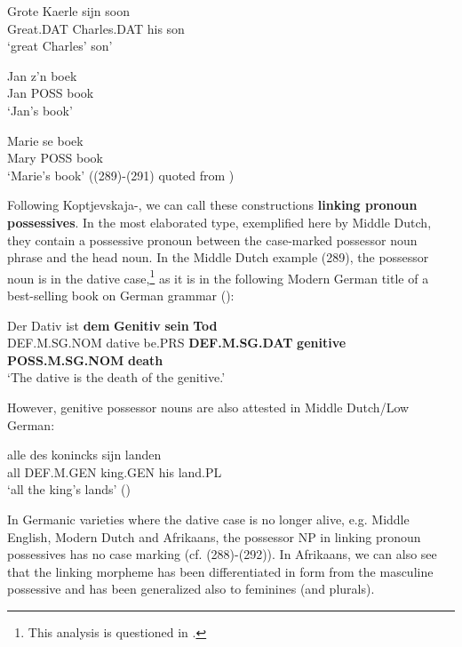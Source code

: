 \ea\label{}
\gll Grote  Kaerle  sijn  soon\\
Great.DAT  Charles.DAT  his  son\\
\glt ‘great Charles’ son’
\z

\ea\label{}
\gll Jan  z’n  boek\\
Jan  POSS   book\\
\glt ‘Jan’s book’
\z

\ea\label{}
\gll Marie  se  boek\\
Mary  POSS  book\\
\glt ‘Marie’s book’ ((289){}-(291) quoted from \citet[56]{Norde1997})
\z

Following Koptjevskaja-\citet{Tamm2003}, we can call these constructions \textbf{linking pronoun possessives}. In the most elaborated type, exemplified here by Middle Dutch, they contain a possessive pronoun between the case-marked possessor noun phrase and the head noun. In the Middle Dutch example (289), the possessor noun is in the dative case,\footnote{ This analysis is questioned in \citet{Allen2008}.} as it is in the following Modern German title of a best-selling book on German grammar (\citet{Sick2004}):


\ea\label{}
\gll Der  Dativ  ist  \textbf{dem} \textbf{Genitiv} \textbf{sein} \textbf{Tod}\\
DEF.M.SG.NOM  dative  be.PRS  \textbf{DEF.M.SG.DAT} \textbf{genitive} \textbf{POSS.M.SG.NOM} \textbf{death}\\
\glt  ‘The dative is the death of the genitive.’
\z

 However, genitive possessor nouns are also attested in Middle Dutch/Low German:


\ea\label{}
\gll alle  des  konincks  sijn  landen\\
all  DEF.M.GEN  king.GEN  his  land.PL\\
\glt ‘all the king’s lands’ (\citet[58]{Norde1997})
\z

In Germanic varieties where the dative case is no longer alive, e.g. Middle English, Modern Dutch and Afrikaans, the possessor NP in linking pronoun possessives has no case marking (cf. (288){}-(292)). In Afrikaans, we can also see that the linking morpheme  has been differentiated in form from the masculine possessive  and has been generalized also to feminines (and plurals).

